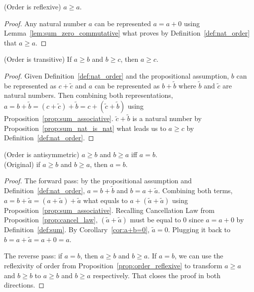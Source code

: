 \begin{subsequence}
    \begin{proposition}
        \color{red}
        \textup{(Order is reflexive)} $a \geq a$.\label{prop:order_reflexive}
    \end{proposition}
    \begin{proof}
        Any natural number $a$ can be represented $a=a + 0$ using Lemma~\ref{lem:sum_zero_commutative} what proves by Definition~\ref{def:nat_order} that $a\geq a$. 
    \end{proof}
    \begin{proposition}
        \color{red}
        \textup{(Order is transitive)}  If $a \geq b$ and $b \geq c$, then $a \geq c$.\label{prop:order_transitive}
    \end{proposition}
    \begin{proof}
        Given Definition~\ref{def:nat_order} and the propositional assumption, $b$ can be represented as $c+\tilde{c}$ and $a$ can be represented as $b+\tilde{b}$ where $\tilde{b}$ and $\tilde{c}$ are natural numbers. Then combining both representations, $a=b+\tilde{b}=(c+\tilde{c}) + \tilde{b}=c+(\tilde{c}+\tilde{b})$ using Proposition~\ref{prop:sum_associative}. $\tilde{c} + \tilde{b}$ is a natural number by Proposition~\ref{prop:sum_nat_is_nat} what leads us to $a\geq c$ by Definition~\ref{def:nat_order}.
    \end{proof}
    \begin{proposition}
        \color{red}
        \textup{(Order is antisymmetric)} $a \geq b$ and $b \geq a$ iff $a = b$.\label{prop:order_antisymmetric}\\
        (Original) if $a \geq b$ and $b \geq a$, then $a = b$.
    \end{proposition}
    \begin{proof}
        The forward pass: by the propositional assumption and Definition~\ref{def:nat_order}, $a=b+\tilde{b}$ and $b=a+\tilde{a}$. Combining both terms, $a=b+\tilde{a}=(a+\tilde{a})+\tilde{a}$ what equals to $a+(\tilde{a}+\tilde{a})$ using Proposition~\ref{prop:sum_associative}. Recalling Cancellation Law from Proposition~\ref{prop:cancel_law}, $(\tilde{a} + \tilde{a})$ must be equal to $0$ since $a=a+0$ by Definition~\ref{def:sum}. By Corollary~\ref{cor:a+b=0}, $\tilde{a}=0$. Plugging it back to $b=a+\tilde{a}=a+0=a$. 
        
        The reverse pass: if $a=b$, then $a\geq b$ and $b \geq a$. If $a=b$, we can use the reflexivity of order from Proposition~\ref{prop:order_reflexive} to transform $a\geq a$ and $b \geq b$ to $a \geq b$ and $b \geq a$ respectively. That closes the proof in both directions.
    \end{proof}


\end{subsequence}
